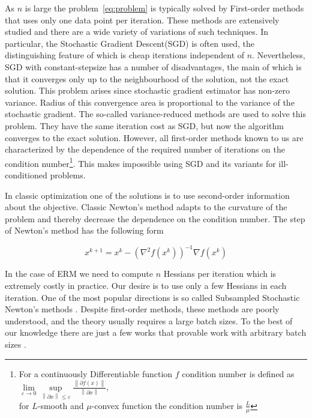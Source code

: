 \documentclass{article}
\begin{document}
As $n$ is large the problem~\eqref{eq:problem} is typically solved by First-order methods that uses only one data point per iteration. These methods are extensively studied \cite{litlink1} and there are a wide variety of variations of such techniques. In particular, the Stochastic Gradient Descent(SGD) is often used, the distinguishing feature of which is cheap iterations independent of $n$. Nevertheless, SGD with constant-stepsize has a number of disadvantages, the main of which is that it converges only up to the neighbourhood of the solution, not the exact solution. This problem arises since stochastic gradient estimator has non-zero variance. Radius of this convergence area is proportional to the variance of the stochastic gradient. The so-called variance-reduced methods \cite{svrg, saga} are used to solve this problem. They have the same iteration cost as SGD, but now the algorithm converges to the exact solution. However, all first-order methods known to us are characterized by the dependence of the required number of iterations on the condition number\footnote{For a continuously Differentiable function $f$ condition number is defined as $\lim\limits_{\varepsilon \rightarrow 0} \sup\limits_{\left\|\partial x\right\| \leq \varepsilon} \frac{\left\|\partial f\left(x\right)\right\|}{\left\|\partial x\right\|}$,\\ for $L$-smooth and $\mu$-convex function the condition number is $\frac{L}{\mu}$}. This makes impossible using SGD and its variants for ill-conditioned problems.

In classic optimization one of the solutions is to use second-order information about the objective. Classic Newton's method adapts to the curvature of the problem and thereby decrease the dependence on the condition number. The step of Newton's method has the following form

\begin{equation}
    x^{k+1} = x^k - \left(\nabla^2f\left(x^k\right)\right)^{-1}\nabla f\left(x^k\right)
\end{equation}

In the case of ERM we need to compute $n$ Hessians per iteration which is extremely costly in practice. Our desire is to use only a few Hessians in each iteration. One of the most popular directions is so called Subsampled Stochastic Newton's methods \cite{litlink7}. Despite first-order methods, these methods are poorly understood, and the theory usually requires a large batch sizes. To the best of our knowledge there are just a few works that provable work with arbitrary batch sizes \cite{litlink3, litlink5, litlink6}.
\end{document}
